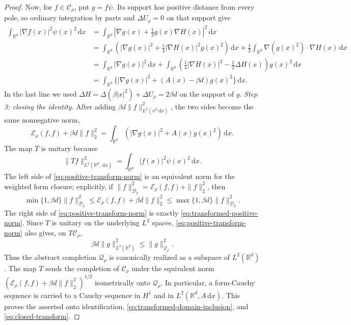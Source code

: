 \documentclass[12pt,reqno,letterpaper]{amsart}
\theoremstyle{definition}
\theoremstyle{remark}
\numberwithin{equation}{section}
\newcommand{\R}{\mathbb R}
\newcommand{\dd}{\,\mathrm d}
\newcommand{\be}{\beta}
\newcommand{\cE}{\mathcal E}
\newcommand{\cD}{\mathcal D}
\begin{document}
\begin{proof}
Now, for \(f\in\mathcal C_\rho\), put \(g=f\psi\).  Its support has positive
distance from every pole, so ordinary integration by parts and
\(\Delta U_{\rho}=0\) on that support give
\begin{align*}
 \int_{\R^d}|\nabla f(x)|^2\psi(x)^2\dd x
 &=\int_{\R^d}\left|\nabla g(x)+\frac12g(x)\nabla H(x)\right|^2\dd x
 \\
 &=\int_{\R^d}\left(|\nabla g(x)|^2+
   \frac14|\nabla H(x)|^2g(x)^2\right)\dd x+\frac12\int_{\R^d}
   \nabla(g(x)^2)\cdot\nabla H(x)\dd x
 \\
 &=\int_{\R^d}|\nabla g(x)|^2\dd x
   +\int_{\R^d}\left(\frac14|\nabla H(x)|^2-
     \frac12\Delta H(x)\right)g(x)^2\dd x\\
 &=\int_{\R^d}\{|\nabla g(x)|^2+(A(x)-\be d)g(x)^2\}\dd x.
\end{align*}
In the last line we used
\(\Delta H=\Delta(\be|x|^2)+\Delta U_\rho=2\be d\) on the support of
\(g\).
\emph{Step 3: closing the identity.}
After adding \(\be d\|f\|_{L^2(\psi^2\dd x)}^2\), the two sides become the
same nonnegative norm,
\begin{equation}\label{eq:positive-transform-norm}
 \cE_\rho(f,f)+\be d\|f\|_2^2
 =\int_{\R^d}(|\nabla g(x)|^2+A(x)g(x)^2)\dd x.
\end{equation}
The map \(T\) is unitary because
\[
 \|Tf\|_{L^2(\R^d,\dd x)}^2
 =\int_{\R^d}|f(x)|^2\psi(x)^2\dd x.
\]
The left side of \eqref{eq:positive-transform-norm} is an equivalent norm
for the weighted form closure; explicitly, if
\(\|f\|_{\cD_\rho}^2=\cE_\rho(f,f)+\|f\|_2^2\), then
\[
 \min\{1,\be d\}\|f\|_{\cD_\rho}^2
 \le\cE_\rho(f,f)+\be d\|f\|_2^2
 \le\max\{1,\be d\}\|f\|_{\cD_\rho}^2.
\]
The right side of \eqref{eq:positive-transform-norm} is exactly
\eqref{eq:transformed-positive-norm}.  Since \(T\) is unitary on the
underlying \(L^2\) spaces, \eqref{eq:positive-transform-norm} also gives,
on \(T\mathcal C_\rho\),
\[
 \be d\|g\|_{L^2(\R^d)}^2
 \le\|g\|_{\mathcal Q_\rho}^2.
\]
Thus the abstract completion \(\mathcal Q_\rho\) is canonically realized as
a subspace of \(L^2(\R^d)\).  The map \(T\) sends the completion of
\(\mathcal C_\rho\) under the equivalent norm
\((\cE_\rho(f,f)+\be d\|f\|_2^2)^{1/2}\) isometrically onto
\(\mathcal Q_\rho\).  In particular, a form-Cauchy
sequence is carried to a Cauchy sequence in \(H^1\) and in
\(L^2(\R^d,A\dd x)\).  This proves the asserted onto identification,
\eqref{eq:transformed-domain-inclusion}, and \eqref{eq:closed-transform}.



\end{proof}
\end{document}
